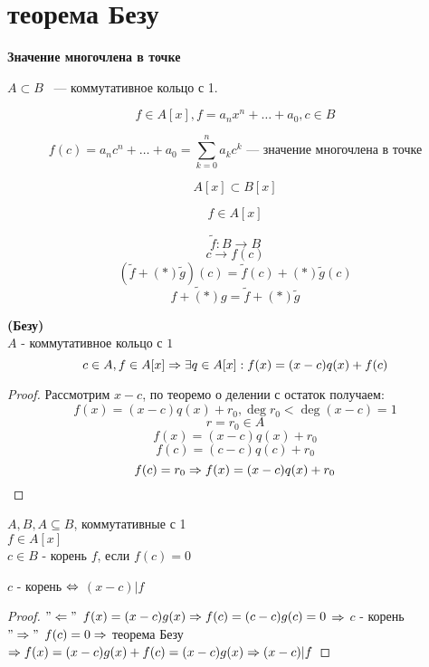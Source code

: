 \section{теорема Безу}
{\bf Значение многочлена в точке}

$A \subset B$ ~---  коммутативное кольцо с 1.

$$f \in A[x], f = a_nx^n + \ldots + a_0, c \in B$$

$$f(c) = a_nc^n + \ldots + a_0 = \sum_{k = 0}^{n}a_kc^k \text{~--- значение многочлена в точке}$$

$$A[x] \subset B[x]$$

$$f \in A[x]$$

$$\tilde f: B \to B$$
$$c \to f(c)$$
$$(\tilde f +(*) \tilde g)(c) = \tilde f(c) +(*) \tilde g(c)$$ 
$$\tilde{f +(*) g} = \tilde f +(*) \tilde g$$

\begin{theorem}{}
\textbf{(Безу)}\\
	$A$ - коммутативное кольцо с $1$
	$$ c \in A, f \in A[x] \Rightarrow \exists q \in A[x]: f(x) = (x - c)q(x) + f(c) $$
\end{theorem}

\begin{proof}
	Рассмотрим $x - c$, по теоремо о делении с остаток получаем:
	$$ f(x) = (x - c)q(x) + r_0, \deg r_0 < \deg (x - c) = 1 $$
	$$ r = r_0 \in A $$
	$$ f(x) = (x - c)q(x) + r_0 $$
	$$ f(c) = (c - c)q(c) + r_0 $$
	$$ f(c) = r_0 \Rightarrow f(x) = (x - c)q(x) + r_0 $$
\end{proof}

\begin{Def}
	$A, B, A \subseteq B$, коммутативные с 1\\
	$f \in A[x]$\\
	$c \in B$ - корень $f$, если $f(c) = 0$\\
\end{Def}

\begin{conseq}
	$c$ - корень $\Leftrightarrow$ $(x - c) | f$\\
\end{conseq}

\begin{proof}
	$"\Leftarrow"$	$f(x) = (x - c)g(x) \Rightarrow f(c) = (c-c)g(c) = 0$ $\Rightarrow$ $c$ - корень\\
	$"\Rightarrow"$	$f(c) = 0 \Rightarrow$ теорема Безу $\Rightarrow f(x) = (x-c)g(x) + f(c) = (x-c)g(x) \Rightarrow (x-c) | f$
\end{proof}
